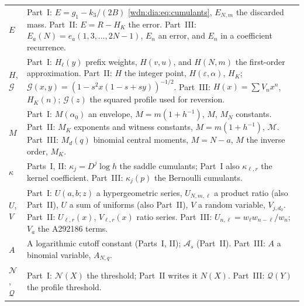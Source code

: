 \documentclass[11pt,letterpaper]{article}
\theoremstyle{remark}\newtheorem{remark}[theorem]{Remark}
\newcommand{\eps}{\varepsilon}
\begin{document}
\begin{longtable}{@{}>{\raggedright\arraybackslash}p{} >{\raggedright\arraybackslash}p{}@{}}
$E$ & Part~I: $E=g_1-k_3/(2B)$ \eqref{wdn:dia:eq:cumulants}, $E_{N,m}$ the discarded mass. Part~II: $E=R-H_K$ the error. Part~III: $E_a(N)=e_a(1,3,\ldots,2N-1)$, $E_n$ an error, and $E_n$ in a coefficient recurrence.\\
$H$, $\mathcal G$ & Part~I: $H_\ell(y)$ prefix weights, $H(v,u)$, and $H(N,m)$ the first-order approximation. Part~II: $H$ the integer point, $H(\eps,\alpha)$, $H_K$; $\mathcal G(x,y)=(1-s^2x(1-s+sy))^{-1/2}$. Part~III: $H(x)=\sum V_nx^n$, $H_K(n)$; $\mathcal G(z)$ the squared profile used for reversion.\\
$M$ & Part~I: $M(\alpha_0)$ an envelope, $M=m(1+h^{-1})$, $M$, $M_N$ constants. Part~II: $M_K$ exponents and witness constants, $M=m(1+h^{-1})$, $\mathcal M$. Part~III: $M_d(q)$ binomial central moments, $M=N-a$, $M$ the inverse order, $M_K$.\\
$\kappa$ & Parts~I, II: $\kappa_j=D^j\log h$ the saddle cumulants; Part~I also $\kappa_{\ell,r}$ the kernel coefficient. Part~III: $\kappa_j(p)$ the Bernoulli cumulants.\\
$U$, $V$ & Part~I: $U(a,b;z)$ a hypergeometric series, $U_{N,m,\ell}$ a product ratio (also Part~II), $U$ a sum of uniforms (also Part~II), $V$ a random variable, $V_{j,d_0}$. Part~II: $U_{\ell,r}(x)$, $V_{\ell,r}(x)$ ratio series. Part~III: $U_{n,\ell}=w_\ell w_{n-\ell}/w_n$; $V_a$ the A292186 terms.\\
$A$ & A logarithmic cutoff constant (Parts~I, II); $\mathcal A_s$ (Part~II). Part~III: $A$ a binomial variable, $A_{N,q}$.\\
$\mathcal N$, $\mathcal Q$ & Part~I: $\mathcal N(X)$ the threshold; Part~II writes it $N(X)$. Part~III: $\mathcal Q(Y)$ the profile threshold.\\
\bottomrule
\end{longtable}
\addtocounter{table}{-1}%
\endgroup
\end{document}
